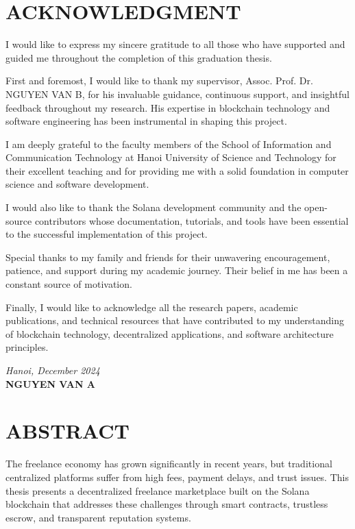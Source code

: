\documentclass[a4paper,13pt,twoside]{report}
\theoremstyle{definition}
\begin{document}
\chapter*{ACKNOWLEDGMENT}

I would like to express my sincere gratitude to all those who have supported and guided me throughout the completion of this graduation thesis.

First and foremost, I would like to thank my supervisor, Assoc. Prof. Dr. NGUYEN VAN B, for his invaluable guidance, continuous support, and insightful feedback throughout my research. His expertise in blockchain technology and software engineering has been instrumental in shaping this project.

I am deeply grateful to the faculty members of the School of Information and Communication Technology at Hanoi University of Science and Technology for their excellent teaching and for providing me with a solid foundation in computer science and software development.

I would also like to thank the Solana development community and the open-source contributors whose documentation, tutorials, and tools have been essential to the successful implementation of this project.

Special thanks to my family and friends for their unwavering encouragement, patience, and support during my academic journey. Their belief in me has been a constant source of motivation.

Finally, I would like to acknowledge all the research papers, academic publications, and technical resources that have contributed to my understanding of blockchain technology, decentralized applications, and software architecture principles.

\vspace{1cm}

\begin{flushright}
\textit{Hanoi, December 2024}\\
\textbf{NGUYEN VAN A}
\end{flushright}

\newpage
\chapter*{ABSTRACT}

The freelance economy has grown significantly in recent years, but traditional centralized platforms suffer from high fees, payment delays, and trust issues. This thesis presents a decentralized freelance marketplace built on the Solana blockchain that addresses these challenges through smart contracts, trustless escrow, and transparent reputation systems.
\end{document}
